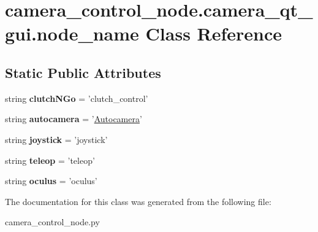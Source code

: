 \hypertarget{classcamera__control__node_1_1camera__qt__gui_1_1node__name}{\section{camera\-\_\-control\-\_\-node.\-camera\-\_\-qt\-\_\-gui.\-node\-\_\-name Class Reference}
\label{classcamera__control__node_1_1camera__qt__gui_1_1node__name}
}
\subsection*{Static Public Attributes}
\begin{DoxyCompactItemize}
\item 
\hypertarget{classcamera__control__node_1_1camera__qt__gui_1_1node__name_ab2a3486e7ae1f280e9006c66a138c9fe}{string {\bfseries clutch\-N\-Go} = 'clutch\-\_\-control'}\label{classcamera__control__node_1_1camera__qt__gui_1_1node__name_ab2a3486e7ae1f280e9006c66a138c9fe}

\item 
\hypertarget{classcamera__control__node_1_1camera__qt__gui_1_1node__name_ae1490012082c209d4ec7b46217377548}{string {\bfseries autocamera} = '\hyperlink{classautocamera__algorithm_1_1Autocamera}{Autocamera}'}\label{classcamera__control__node_1_1camera__qt__gui_1_1node__name_ae1490012082c209d4ec7b46217377548}

\item 
\hypertarget{classcamera__control__node_1_1camera__qt__gui_1_1node__name_acf51bf9c4f26c3ad9b4e7245ee98c908}{string {\bfseries joystick} = 'joystick'}\label{classcamera__control__node_1_1camera__qt__gui_1_1node__name_acf51bf9c4f26c3ad9b4e7245ee98c908}

\item 
\hypertarget{classcamera__control__node_1_1camera__qt__gui_1_1node__name_ad25806ce0f8bea28dd7cf9fedcd88736}{string {\bfseries teleop} = 'teleop'}\label{classcamera__control__node_1_1camera__qt__gui_1_1node__name_ad25806ce0f8bea28dd7cf9fedcd88736}

\item 
\hypertarget{classcamera__control__node_1_1camera__qt__gui_1_1node__name_a56c4826e721af6a03d3245287de73e1d}{string {\bfseries oculus} = 'oculus'}\label{classcamera__control__node_1_1camera__qt__gui_1_1node__name_a56c4826e721af6a03d3245287de73e1d}

\end{DoxyCompactItemize}


The documentation for this class was generated from the following file\-:\begin{DoxyCompactItemize}
\item 
camera\-\_\-control\-\_\-node.\-py\end{DoxyCompactItemize}

